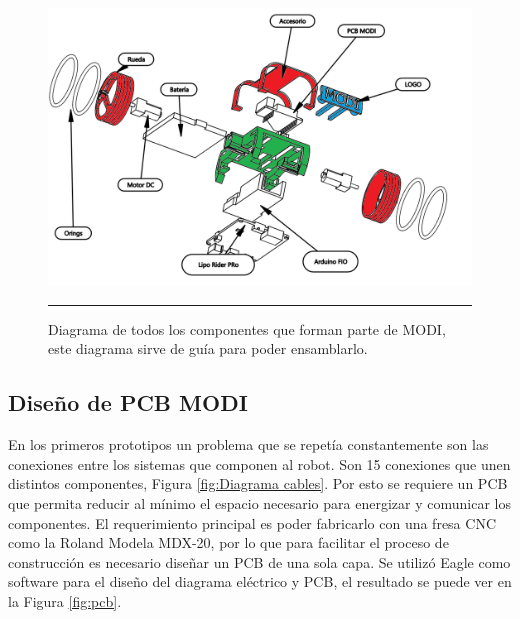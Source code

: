 \begin{figure}[htbp]
	\centering
		\includegraphics[width=\textwidth]{./Figures/MODI/ensamble.png}
		\rule{35em}{0.5pt}
	\caption[Diagrama MODI versión final]{Diagrama de todos los componentes que forman parte de MODI, este diagrama sirve de guía para poder ensamblarlo.}
	\label{fig:DiagramaVersionFinal}
\end{figure}	


\subsection{Diseño de PCB MODI}

En los primeros prototipos un problema que se repetía constantemente son las conexiones entre los sistemas que componen al robot. Son 15 conexiones que unen distintos componentes, Figura \ref{fig:Diagrama cables}. Por esto se requiere un PCB que permita reducir al mínimo el espacio necesario para energizar y comunicar los componentes. El requerimiento principal es poder fabricarlo con una fresa CNC como la Roland Modela MDX-20, por lo que para facilitar el proceso de construcción es necesario diseñar un PCB de una sola capa. Se utilizó Eagle como software para el diseño del diagrama eléctrico y PCB, el resultado se puede ver en la Figura \ref{fig:pcb}.


